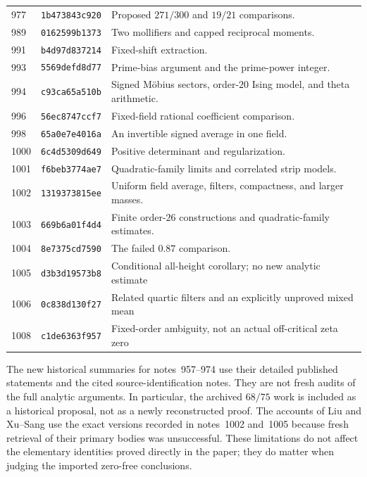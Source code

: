 \begin{longtable}{@{}p{1.5cm}p{2.4cm}>{\raggedright\arraybackslash}p{10.7cm}@{}}
977 & \texttt{1b473843c920} & Proposed $271/300$ and $19/21$ comparisons.\\[3pt]
989 & \texttt{0162599b1373} & Two mollifiers and capped reciprocal moments.\\[3pt]
991 & \texttt{b4d97d837214} & Fixed-shift extraction.\\[3pt]
993 & \texttt{5569defd8d77} & Prime-bias argument and the prime-power integer.\\[3pt]
994 & \texttt{c93ca65a510b} & Signed M\"obius sectors, order-$20$ Ising model, and theta arithmetic.\\[3pt]
996 & \texttt{56ec8747ccf7} & Fixed-field rational coefficient comparison.\\[3pt]
998 & \texttt{65a0e7e4016a} & An invertible signed average in one field.\\[3pt]
1000 & \texttt{6c4d5309d649} & Positive determinant and regularization.\\[3pt]
1001 & \texttt{f6beb3774ae7} & Quadratic-family limits and correlated strip models.\\[3pt]
1002 & \texttt{1319373815ee} & Uniform field average, filters, compactness, and larger masses.\\[3pt]
1003 & \texttt{669b6a01f4d4} & Finite order-$26$ constructions and quadratic-family estimates.\\[3pt]
1004 & \texttt{8e7375cd7590} & The failed $0.87$ comparison.\\[3pt]
1005 & \texttt{d3b3d19573b8} & Conditional all-height corollary; no new analytic estimate\\[3pt]
1006 & \texttt{0c838d130f27} & Related quartic filters and an explicitly unproved mixed mean\\[3pt]
1008 & \texttt{c1de6363f957} & Fixed-order ambiguity, not an actual off-critical zeta zero\\[3pt]
\end{longtable}
\normalsize

The new historical summaries for notes~957--974 use their detailed published statements and the cited source-identification notes. They are not fresh audits of the full analytic arguments. In particular, the archived $68/75$ work is included as a historical proposal, not as a newly reconstructed proof. The accounts of Liu and Xu--Sang use the exact versions recorded in notes~1002 and~1005 because fresh retrieval of their primary bodies was unsuccessful. These limitations do not affect the elementary identities proved directly in the paper; they do matter when judging the imported zero-free conclusions.

